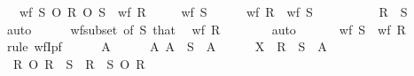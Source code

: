 \begin{isabellebody}
\ \ \ {\isachardoublequoteopen}wf\ {\isacharparenleft}{\kern0pt}S\isactrlsup {\isacharasterisk}{\kern0pt}\ O\ R\ O\ S\isactrlsup {\isacharasterisk}{\kern0pt}{\isacharparenright}{\kern0pt}\ {\isasymlongleftrightarrow}\ wf\ R{\isachardoublequoteclose}\isanewline
\ \ \ \ {\isacharparenleft}{\kern0pt}\ {\isachardoublequoteopen}wf\ {\isacharquery}{\kern0pt}S\ {\isasymlongleftrightarrow}\ {\isacharunderscore}{\kern0pt}{\isachardoublequoteclose}{\isacharparenright}{\kern0pt}\isanewline
%
\isadelimproof
%
\endisadelimproof
%
\isatagproof
{}\isamarkupfalse%
\isanewline
\ \ \isamarkupfalse%
\ {\isachardoublequoteopen}wf\ R{\isachardoublequoteclose}\ \ {\isachardoublequoteopen}wf\ {\isacharquery}{\kern0pt}S{\isachardoublequoteclose}\isanewline
\ \ \isamarkupfalse%
\ {\isacharminus}{\kern0pt}\isanewline
\ \ \ \ \isamarkupfalse%
\ {\isachardoublequoteopen}R\ {\isasymsubseteq}\ {\isacharquery}{\kern0pt}S{\isachardoublequoteclose}\ \isamarkupfalse%
\ auto\isanewline
\ \ \ \ \isamarkupfalse%
\ wf{\isacharunderscore}{\kern0pt}subset\ {\isacharbrackleft}{\kern0pt}of\ {\isacharquery}{\kern0pt}S{\isacharbrackright}{\kern0pt}\ that\ \isamarkupfalse%
\ {\isachardoublequoteopen}wf\ R{\isachardoublequoteclose}\isanewline
\ \ \ \ \ \ \isamarkupfalse%
\ auto\isanewline
\ \ \isamarkupfalse%
\isanewline
{}\isamarkupfalse%
\isanewline
\ \ \isamarkupfalse%
\ {\isachardoublequoteopen}wf\ {\isacharquery}{\kern0pt}S{\isachardoublequoteclose}\ \ {\isachardoublequoteopen}wf\ R{\isachardoublequoteclose}\isanewline
\ \ \isamarkupfalse%
\ {\isacharparenleft}{\kern0pt}rule\ wfI{\isacharunderscore}{\kern0pt}pf{\isacharparenright}{\kern0pt}\isanewline
\ \ \ \ \isamarkupfalse%
\ A\isanewline
\ \ \ \ \isamarkupfalse%
\ A{\isacharcolon}{\kern0pt}\ {\isachardoublequoteopen}A\ {\isasymsubseteq}\ {\isacharquery}{\kern0pt}S\ {\isacharbackquote}{\kern0pt}{\isacharbackquote}{\kern0pt}\ A{\isachardoublequoteclose}\isanewline
\ \ \ \ \isamarkupfalse%
\ {\isacharquery}{\kern0pt}X\ {\isacharequal}{\kern0pt}\ {\isachardoublequoteopen}{\isacharparenleft}{\kern0pt}R\ {\isasymunion}\ S{\isacharparenright}{\kern0pt}\isactrlsup {\isacharasterisk}{\kern0pt}\ {\isacharbackquote}{\kern0pt}{\isacharbackquote}{\kern0pt}\ A{\isachardoublequoteclose}\isanewline
\ \ \ \ \isamarkupfalse%
\ {\isacharasterisk}{\kern0pt}{\isacharcolon}{\kern0pt}\ {\isachardoublequoteopen}R\ O\ {\isacharparenleft}{\kern0pt}R\ {\isasymunion}\ S{\isacharparenright}{\kern0pt}\isactrlsup {\isacharasterisk}{\kern0pt}\ {\isasymsubseteq}\ {\isacharparenleft}{\kern0pt}R\ {\isasymunion}\ S{\isacharparenright}{\kern0pt}\isactrlsup {\isacharasterisk}{\kern0pt}\ O\ R{\isachardoublequoteclose}\isanewline

\end{isabellebody}
